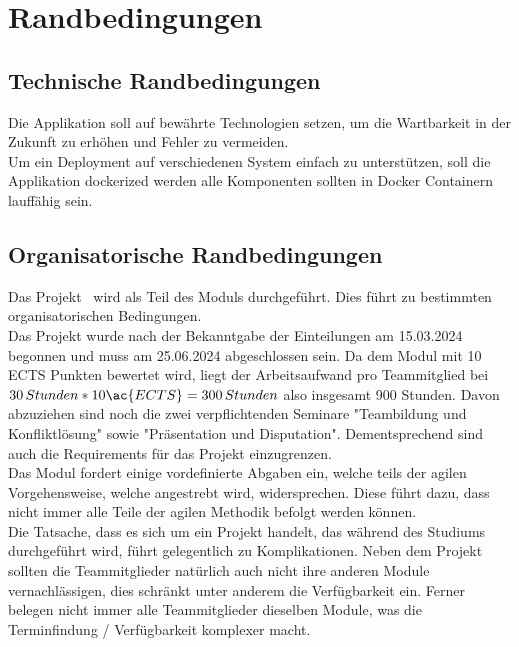 \chapter{Randbedingungen}\label{ch:randbedingungen}


\section{Technische Randbedingungen}\label{sec:technische-randbedingungen}

Die Applikation soll auf bewährte Technologien setzen, um die Wartbarkeit in der Zukunft zu erhöhen und Fehler zu vermeiden.\\

Um ein Deployment auf verschiedenen System einfach zu unterstützen, soll die Applikation dockerized werden
\dah alle Komponenten sollten in Docker Containern lauffähig sein.


\section{Organisatorische Randbedingungen}\label{sec:organisatorische-randbedingungen}

Das Projekt \workTitel~wird als Teil des Moduls \workTyp durchgeführt.
Dies führt zu bestimmten organisatorischen Bedingungen.\\
Das Projekt wurde nach der Bekanntgabe der Einteilungen am 15.03.2024 begonnen und muss am 25.06.2024 abgeschlossen sein.
Da dem Modul mit 10 \ac{ECTS} Punkten bewertet wird, liegt der Arbeitsaufwand pro Teammitglied bei \(30\,Stunden * 10 \ac{ECTS} = 300\,Stunden\) also insgesamt 900 Stunden.
Davon abzuziehen sind noch die zwei verpflichtenden Seminare "Teambildung und Konfliktlösung" sowie "Präsentation und Disputation".
Dementsprechend sind auch die Requirements für das Projekt einzugrenzen.\\

Das Modul fordert einige vordefinierte Abgaben ein, welche teils der agilen Vorgehensweise, welche angestrebt wird, widersprechen.
Diese führt dazu, dass nicht immer alle Teile der agilen Methodik befolgt werden können.\\

Die Tatsache, dass es sich um ein Projekt handelt, das während des Studiums durchgeführt wird, führt gelegentlich zu Komplikationen.
Neben dem Projekt sollten die Teammitglieder natürlich auch nicht ihre anderen Module vernachlässigen, dies schränkt unter anderem die Verfügbarkeit ein.
Ferner belegen nicht immer alle Teammitglieder dieselben Module, was die Terminfindung / Verfügbarkeit komplexer macht.